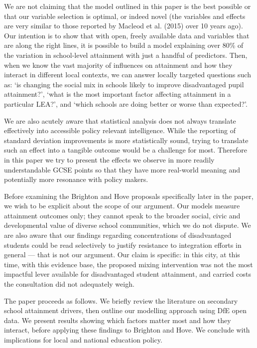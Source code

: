 \documentclass[
  12pt,
  titlepage]{article}
\begin{document}
We are not claiming that the model outlined in this paper is the best
possible or that our variable selection is optimal, or indeed novel (the
variables and effects are very similar to those reported by Macleod et
al. (2015) over 10 years ago). Our intention is to show that with open,
freely available data and variables that are along the right lines, it
is possible to build a model explaining over 80\% of the variation in
school-level attainment with just a handful of predictors. Then, when we
know the vast majority of influences on attainment and how they interact
in different local contexts, we can answer locally targeted questions
such as: `is changing the social mix in schools likely to improve
disadvantaged pupil attainment?', `what is the most important factor
affecting attainment in a particular LEA?', and `which schools are doing
better or worse than expected?'.

We are also acutely aware that statistical analysis does not always
translate effectively into accessible policy relevant intelligence.
While the reporting of standard deviation improvements is more
statistically sound, trying to translate such an effect into a tangible
outcome would be a challenge for most. Therefore in this paper we try to
present the effects we observe in more readily understandable GCSE
points so that they have more real-world meaning and potentially more
resonance with policy makers.

Before examining the Brighton and Hove proposals specifically later in
the paper, we wish to be explicit about the scope of our argument. Our
models measure attainment outcomes only; they cannot speak to the
broader social, civic and developmental value of diverse school
communities, which we do not dispute. We are also aware that our
findings regarding concentrations of disadvantaged students could be
read selectively to justify resistance to integration efforts in general
--- that is not our argument. Our claim is specific: in this city, at
this time, with this evidence base, the proposed mixing intervention was
not the most impactful lever available for disadvantaged student
attainment, and carried costs the consultation did not adequately weigh.

The paper proceeds as follows. We briefly review the literature on
secondary school attainment drivers, then outline our modelling approach
using DfE open data. We present results showing which factors matter
most and how they interact, before applying these findings to Brighton
and Hove. We conclude with implications for local and national education
policy.
\end{document}
